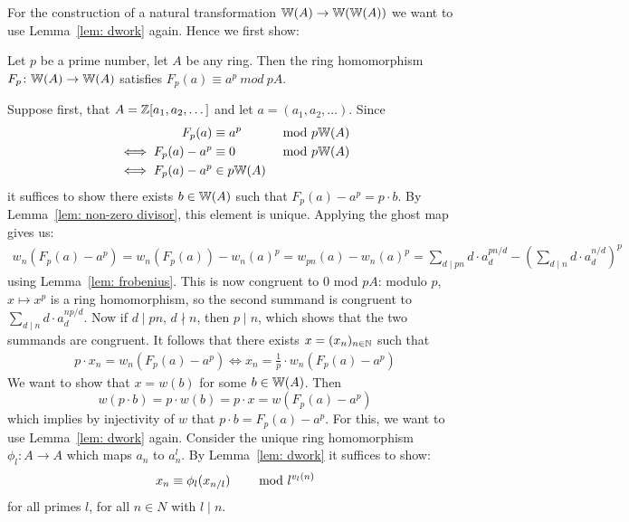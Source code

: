 For the construction of a natural transformation $\mathbb{W}(A) \to \mathbb{W}(\mathbb{W}(A))$
we want to use Lemma~\ref{lem: dwork} again. Hence we first show:
\begin{lemma} \label{lem: frobenius lifts frobenius}
    Let $p$ be a prime number, let $A$ be any ring.
    Then the ring homomorphism $F_p \colon \mathbb{W}(A) \to \mathbb{W}(A)$  
    satisfies $F_p(a) \equiv a^p \ mod \ pA.$
\end{lemma}
\begin{beweis}
    Suppose first, that $A = \mathbb{Z}[a_1,a_2,\dots]$ and let $a = (a_1,a_2,\dots)$. Since
    \begin{align*}
        F_p(a) &\equiv a^p \hskip8mm &\text{mod } p\mathbb{W}(A) \\
        \iff F_p(a)-a^p &\equiv 0 \hskip8mm &\text{mod } p\mathbb{W}(A) \\
        \iff F_p(a) - a^p &\in p\mathbb{W}(A) \\
    \end{align*}
    it suffices to show there exists $b \in \mathbb{W}(A)$ such that $F_p(a)-a^p = p\cdot b$.
    By Lemma~\ref{lem: non-zero divisor}, this element is unique. Applying the ghost map gives us:
    \begin{align*}
        w_n(F_p(a) - a^p) = w_n(F_p(a))-w_n(a)^p = w_{pn}(a) - w_n(a)^p 
        = \sum_{d \mid pn}d \cdot a_d^{pn/d} - ( \sum_{d \mid n} d \cdot a_d^{n/d})^p
    \end{align*}
    using Lemma~\ref{lem: frobenius}. This is now congruent to $0$ mod $pA$:
    modulo $p$, $x \mapsto x^p$ is a ring homomorphism, so the second summand is congruent
    to $\sum_{d \mid n}d \cdot a_d^{np/d}$. Now if $d \mid pn$, $d \nmid n$, then
    $p \mid n$, which shows that the two summands are congruent.
    It follows that there exists $x = (x_n)_{n \in \mathbb{N}}$ such that 
    \begin{align}
        \label{eq: p cdot x_n}
        p \cdot x_n = w_n(F_p(a)-a^p)
        \iff x_n = \frac{1}{p} \cdot w_n(F_p(a)-a^p)
    \end{align}
    We want to show that $x = w(b)$ for some $b \in \mathbb{W}(A)$.
    Then 
    \[
        w(p \cdot b) = p \cdot w(b) = p \cdot x = w(F_p(a)-a^p)
    \]
    which implies by injectivity of $w$ that $p \cdot b = F_p(a) -a^p$.
    For this, we want to use Lemma~\ref{lem: dwork} again.
    Consider the unique ring homomorphism $\phi_l \colon A \to A$ which maps
    $a_n$ to $a_n^l$. By Lemma~\ref{lem: dwork} it suffices to show: 
    \[
        x_n \equiv \phi_l(x_{n/l}) \text{\hskip8mm mod }l^{v_l(n)}
    \]
    for all primes $l$, for all $n \in N$ with $l \mid n$.

\end{beweis}
